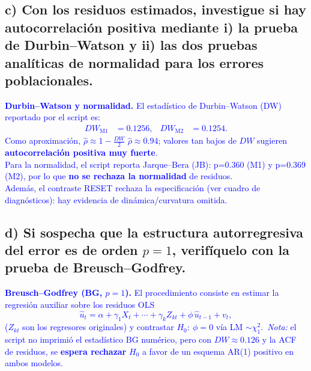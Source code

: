 \documentclass[10pt]{article}
\begin{document}
\subsection{c) Con los residuos estimados, investigue si hay autocorrelación positiva mediante i) la prueba de Durbin--Watson y ii) las dos pruebas analíticas de normalidad para los errores poblacionales.}
\textcolor{blue}{
\textbf{Durbin–Watson y normalidad.} El estadístico de Durbin–Watson (DW) reportado por el script es:
\begin{align*}
DW_{\text{M1}}&=0.1256, & DW_{\text{M2}}&=0.1254.
\end{align*}
Como aproximación, $\hat\rho\approx 1-\tfrac{DW}{2}$ \Rightarrow $\hat\rho\approx 0.94$; valores tan bajos de $DW$ sugieren \textbf{autocorrelación positiva muy fuerte}.\\
Para la normalidad, el script reporta Jarque–Bera (JB): p=0.360 (M1) y p=0.369 (M2), por lo que \textbf{no se rechaza la normalidad} de residuos.\\
Además, el contraste RESET rechaza la especificación (ver cuadro de diagnósticos): hay evidencia de dinámica/curvatura omitida.

}

\subsection{d) Si sospecha que la estructura autorregresiva del error es de orden \texorpdfstring{$p=1$}{p=1}, verifíquelo con la prueba de Breusch--Godfrey.}
\textcolor{blue}{
\textbf{Breusch--Godfrey (BG, $p=1$).} El procedimiento consiste en estimar la regresión auxiliar sobre los residuos OLS
\begin{equation*}
\hat u_t = \alpha + \gamma_1 X_t + \cdots + \gamma_k Z_{kt} + \phi\,\hat u_{t-1} + v_t,
\end{equation*}
(\(Z_{kt}\) son los regresores originales) y contrastar $H_0\!:\ \phi=0$ vía LM $\sim\chi^2_1$.\
\textit{Nota:} el script no imprimió el estadístico BG numérico, pero con $DW\approx0.126$ y la ACF de residuos, se \textbf{espera rechazar} $H_0$ a favor de un esquema AR(1) positivo en ambos modelos.
}
\end{document}
